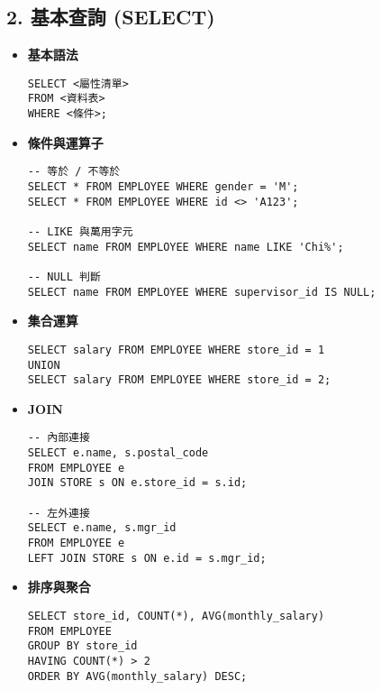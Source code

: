 \documentclass[12pt,a4paper]{article}
\begin{document}
\subsection*{2. 基本查詢 (SELECT)}
\begin{itemize}
  \item \textbf{基本語法}
  \begin{verbatim}
SELECT <屬性清單>
FROM <資料表>
WHERE <條件>;
  \end{verbatim}

  \item \textbf{條件與運算子}
  \begin{verbatim}
-- 等於 / 不等於
SELECT * FROM EMPLOYEE WHERE gender = 'M';
SELECT * FROM EMPLOYEE WHERE id <> 'A123';

-- LIKE 與萬用字元
SELECT name FROM EMPLOYEE WHERE name LIKE 'Chi%';

-- NULL 判斷
SELECT name FROM EMPLOYEE WHERE supervisor_id IS NULL;
  \end{verbatim}

  \item \textbf{集合運算}
  \begin{verbatim}
SELECT salary FROM EMPLOYEE WHERE store_id = 1
UNION
SELECT salary FROM EMPLOYEE WHERE store_id = 2;
  \end{verbatim}

  \item \textbf{JOIN}
  \begin{verbatim}
-- 內部連接
SELECT e.name, s.postal_code
FROM EMPLOYEE e
JOIN STORE s ON e.store_id = s.id;

-- 左外連接
SELECT e.name, s.mgr_id
FROM EMPLOYEE e
LEFT JOIN STORE s ON e.id = s.mgr_id;
  \end{verbatim}

  \item \textbf{排序與聚合}
  \begin{verbatim}
SELECT store_id, COUNT(*), AVG(monthly_salary)
FROM EMPLOYEE
GROUP BY store_id
HAVING COUNT(*) > 2
ORDER BY AVG(monthly_salary) DESC;
  \end{verbatim}
\end{itemize}
\end{document}
